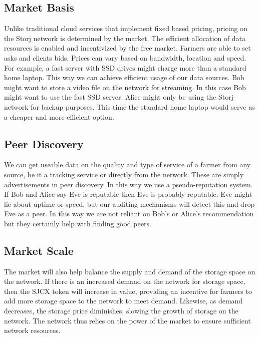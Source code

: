 \documentclass[a4paper,10pt]{article}
\begin{document}
\subsection{Market Basis}
Unlike traditional cloud services that implement fixed based pricing, pricing on the Storj network is determined by the market. The efficient allocation of data resources is enabled and incentivized by the free market. Farmers are able to set asks and clients bids. Prices can vary based on bandwidth, location and speed. For example, a fast server with SSD drives might charge more than a standard home laptop. This way we can achieve efficient usage of our data sources. Bob might want to store a video file on the network for streaming. In this case Bob might want to use the fast SSD server. Alice might only be using the Storj network for backup purposes. This time the standard home laptop would serve as a cheaper and more efficient option.

\subsection{Peer Discovery}
We can get useable data on the quality and type of service of a farmer from any source, be it a tracking service or directly from the network. These are simply advertisements in peer discovery. In this way we use a pseudo-reputation system. If Bob and Alice say Eve is reputable then Eve is probably reputable. Eve might lie about uptime or speed, but our auditing mechanisms will detect this and drop Eve as a peer. In this way we are not reliant on Bob’s or Alice’s recommendation but they certainly help with finding good peers.

\subsection{Market Scale}
The market will also help balance the supply and demand of the storage space on the network. If there is an increased demand on the network for storage space, then the SJCX token will increase in value, providing an incentive for farmers to add more storage space to the network to meet demand. Likewise, as demand decreases, the storage price diminishes, slowing the growth of storage on the network. The network thus relies on the power of the market to ensure sufficient network resources. 
\end{document}
